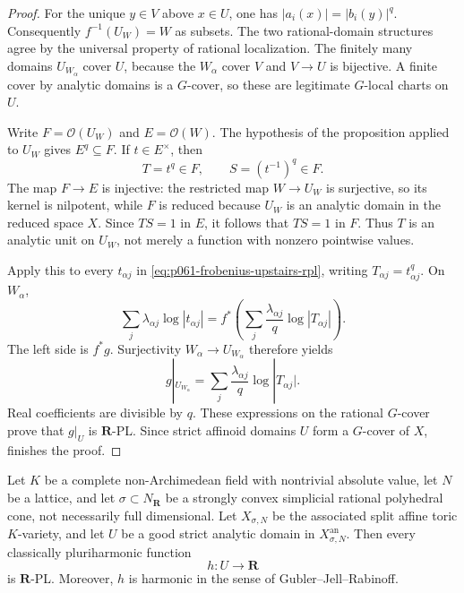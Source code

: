 \begin{proof}
For the unique \(y\in V\) above \(x\in U\), one has
\(|a_i(x)|=|b_i(y)|^q\).  Consequently
\(f^{-1}(U_W)=W\) as subsets.  The two rational-domain structures agree by
the universal property of rational localization.  The finitely many
domains \(U_{W_\alpha}\) cover \(U\), because the \(W_\alpha\) cover \(V\)
and \(V\to U\) is bijective.  A finite cover by analytic domains is a
\(G\)-cover, so these are legitimate \(G\)-local charts on \(U\).

Write \(F=\mathcal O(U_W)\) and \(E=\mathcal O(W)\).  The hypothesis of the
proposition applied to \(U_W\) gives \(E^q\subseteq F\).  If
\(t\in E^\times\), then
\[
                         T=t^q\in F,
              \qquad S=(t^{-1})^q\in F.
\]
The map \(F\to E\) is injective: the restricted map
\(W\to U_W\) is surjective, so its kernel is nilpotent, while \(F\) is
reduced because \(U_W\) is an analytic domain in the reduced space \(X\).
Since \(TS=1\) in \(E\), it follows that \(TS=1\) in \(F\).  Thus \(T\) is
an analytic unit on \(U_W\), not merely a function with nonzero pointwise
values.

Apply this to every \(t_{\alpha j}\) in
\eqref{eq:p061-frobenius-upstairs-rpl}, writing
\(T_{\alpha j}=t_{\alpha j}^q\).  On \(W_\alpha\),
\[
 \sum_j\lambda_{\alpha j}\log|t_{\alpha j}|
 =f^*\!\left(
       \sum_j\frac{\lambda_{\alpha j}}q\log|T_{\alpha j}|
            \right).
\]
The left side is \(f^*g\).  Surjectivity
\(W_\alpha\to U_{W_\alpha}\) therefore yields
\[
       g|_{U_{W_\alpha}}
       =\sum_j\frac{\lambda_{\alpha j}}q
                         \log|T_{\alpha j}|.
\]
Real coefficients are divisible by \(q\).  These expressions on the
rational \(G\)-cover prove that \(g|_U\) is \(\mathbf R\)-PL.  Since strict
affinoid domains \(U\) form a \(G\)-cover of \(X\),
\cite[\S5.2(4)]{GJR26} finishes the proof.
\end{proof}

\begin{theorem}
\label{thm:p061-simplicial-toric-ph-rpl}
Let \(K\) be a complete non-Archimedean field with nontrivial absolute
value, let \(N\) be a lattice, and let
\(\sigma\subset N_{\mathbf R}\) be a strongly convex simplicial rational
polyhedral cone, not necessarily full dimensional.  Let
\(X_{\sigma,N}\) be the associated split affine toric \(K\)-variety, and
let \(U\) be a good strict analytic domain in
\(X_{\sigma,N}^{\mathrm{an}}\).  Then every classically pluriharmonic
function
\[
                              h:U\longrightarrow\mathbf R
\]
is \(\mathbf R\)-PL.  Moreover, \(h\) is harmonic in the sense of
Gubler--Jell--Rabinoff.
\end{theorem}

